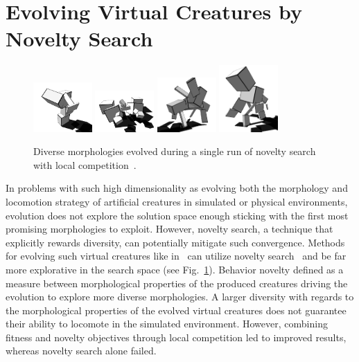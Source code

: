 \section{Evolving Virtual Creatures by Novelty Search}

\begin{figure}[t!]
\centering
\includegraphics[width=0.2\textwidth]{../Figures/Misc/nov1.png}
\includegraphics[width=0.2\textwidth]{../Figures/Misc/nov2.png}
\includegraphics[width=0.2\textwidth]{../Figures/Misc/nov3.png}
\includegraphics[width=0.2\textwidth]{../Figures/Misc/nov4.png}
\caption{Diverse morphologies evolved during a single run of novelty search with local competition~\citep{lehman2011evolving}.}
\label{fig:noveltySims}
\end{figure}

In problems with such high dimensionality as evolving both the morphology and locomotion strategy of artificial creatures in simulated or physical environments, evolution does not explore the solution space enough sticking with the first most promising morphologies to exploit. However, novelty search, a technique that explicitly rewards diversity, can potentially mitigate such convergence. Methods for evolving such virtual creatures like in~\citep{sims1994evolving} can utilize novelty search~\citep{lehman2011evolving} and be far more explorative in the search space (see Fig.~\ref{fig:noveltySims}). Behavior novelty defined as a measure between morphological properties of the produced creatures driving the evolution to explore more diverse morphologies. A larger diversity with regards to the morphological properties of the evolved virtual creatures does not guarantee their ability to locomote in the simulated environment. However, combining fitness and novelty objectives through local competition led to improved results, whereas novelty search alone failed. 

